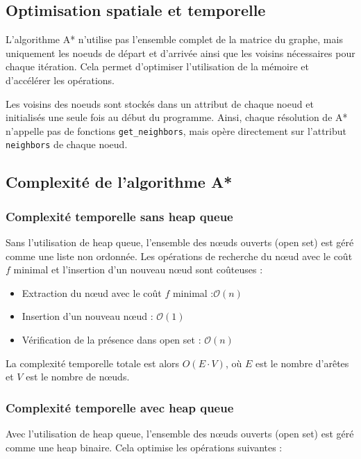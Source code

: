 \subsection{Optimisation spatiale et temporelle}
L'algorithme A* n'utilise pas l'ensemble complet de la matrice du graphe, mais uniquement les noeuds de départ et d'arrivée ainsi que les voisins nécessaires pour chaque itération. Cela permet d'optimiser l'utilisation de la mémoire et d'accélérer les opérations.

Les voisins des noeuds sont stockés dans un attribut de chaque noeud et initialisés une seule fois au début du programme. Ainsi, chaque résolution de A* n'appelle pas de fonctions \texttt{get\_neighbors}, mais opère directement sur l'attribut \texttt{neighbors} de chaque noeud.

\subsection{Complexité de l'algorithme A*}

\subsubsection{Complexité temporelle sans heap queue}
Sans l'utilisation de heap queue, l'ensemble des nœuds ouverts (open set) est géré comme une liste non ordonnée. Les opérations de recherche du nœud avec le coût \( f \) minimal et l'insertion d'un nouveau nœud sont coûteuses :

\begin{itemize}
    \item Extraction du nœud avec le coût \( f \) minimal :$\mathcal{O}(n)$
    \item Insertion d'un nouveau nœud : $\mathcal{O}(1)$
    \item Vérification de la présence dans open set : $\mathcal{O}(n)$
\end{itemize}

La complexité temporelle totale est alors \( O(E \cdot V) \), où \( E \) est le nombre d'arêtes et \( V \) est le nombre de nœuds.

\subsubsection{Complexité temporelle avec heap queue}
Avec l'utilisation de heap queue, l'ensemble des nœuds ouverts (open set) est géré comme une heap binaire. Cela optimise les opérations suivantes :

